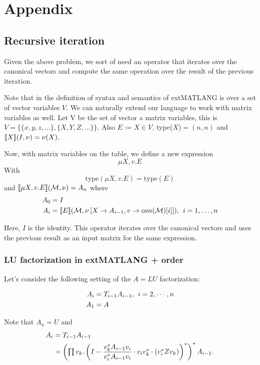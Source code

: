 \newpage

\section{Appendix}

\subsection{Recursive iteration}

Given the above problem, we sort of need an operator that iterates over the canonical vectors and compute the same operation over the result of the previous iteration.

Note that in the definition of syntax and semantics of extMATLANG is over a set of vector variables $V$. We can naturally extend our language to work with matrix variables as well. Let V be the set of vector a matrix variables, this is $V=\lbrace\lbrace x, y, z, \ldots\rbrace,\lbrace X,Y,Z,\ldots\rbrace\rbrace$. Also $E:=X\in V$, type($X$)$=(n, n)$ and $\llbracket X \rrbracket(I,\nu)=\nu(X)$.

Now, with matrix variables on the table, we define a new expression $$\mu X, v.E$$ With $$\text{type}(\mu X,v. E) = \text{type}(E)$$ and $\llbracket \mu X,v. E \rrbracket(\mathcal{M},\nu) = A_n$ where
\begin{align*}
A_0 &= I \\
A_i &= \llbracket E \rrbracket(\mathcal{M},\nu\left[X\rightarrow A_{i-1}, v\rightarrow can(\mathcal{M})[i]\right]),\hspace{1ex} i= 1, \ldots, n 
\end{align*}

Here, $I$ is the identity. This operator iterates over the canonical vectors and uses the previous result as an input matrix for the same expression.

\subsubsection{LU factorization in extMATLANG + order}
Let's consider the following setting of the $A=LU$ factorization:

\begin{align*}
A_i&=T_{i-1}A_{i-1},\hspace{1ex}i=2, \cdots, n \\
A_1&=A \\
\end{align*}

Note that $A_n=U$ and 
\begin{align*}
A_i&=T_{i-1}A_{i-1} \\
&=\left(\textstyle\prod v_k.\left(I-\dfrac{v_k^*A_{i-1}v_i}{v_i^*A_{i-1}v_i}\cdot v_iv_k^*\cdot\left(v_i^*Zv_k\right)\right)^*\right)^*A_{i-1}.
\end{align*}

